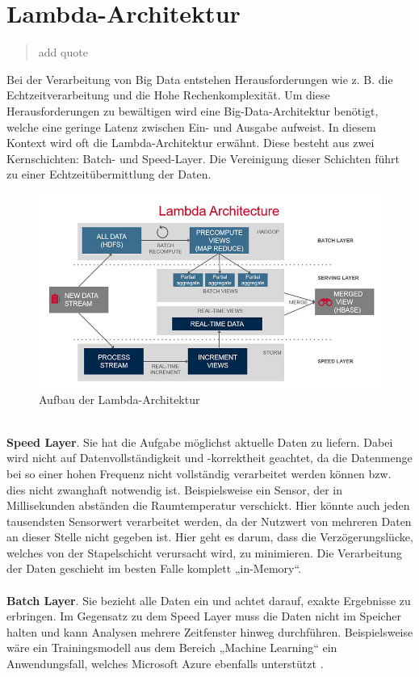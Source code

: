 \section{Lambda-Architektur}

\begin{quote}\glqq add quote \grqq~\cite[S.14]{Roth.2016}\end{quote} 
Bei der Verarbeitung von Big Data entstehen Herausforderungen wie z. B. die Echtzeitverarbeitung und die Hohe Rechenkomplexität. Um diese Herausforderungen zu bewältigen wird eine Big-Data-Architektur benötigt, welche eine geringe Latenz zwischen Ein- und Ausgabe aufweist. In diesem Kontext wird oft die Lambda-Architektur erwähnt. Diese besteht aus zwei Kernschichten: Batch- und Speed-Layer. Die Vereinigung dieser Schichten führt zu einer Echtzeitübermittlung der Daten. 
\begin{figure}[h!]
	\centering
	\includegraphics[width=1.0\linewidth]{images/lambda-architecture}
	\caption{Aufbau der Lambda-Architektur} %
	\label{fig:cnn_structure}
\end{figure}
\\ \textbf{Speed Layer}. Sie hat die Aufgabe möglichst aktuelle Daten zu liefern. Dabei wird nicht auf Datenvollständigkeit und -korrektheit geachtet, da die Datenmenge bei so einer hohen Frequenz nicht vollständig verarbeitet werden können bzw. dies nicht zwanghaft notwendig ist. Beispielsweise ein Sensor, der in Millisekunden abständen die Raumtemperatur verschickt. Hier könnte auch jeden tausendsten Sensorwert verarbeitet werden, da der Nutzwert von mehreren Daten an dieser Stelle nicht gegeben ist. Hier geht es darum, dass die Verzögerungslücke, welches von der Stapelschicht verursacht wird, zu minimieren. Die Verarbeitung der Daten geschieht im besten Falle komplett „in-Memory“.\\ \\ \textbf{Batch Layer}. Sie bezieht alle Daten ein und achtet darauf, exakte Ergebnisse zu erbringen. Im Gegensatz zu dem Speed Layer muss die Daten nicht im Speicher halten und kann Analysen mehrere Zeitfenster hinweg durchführen. Beispielsweise wäre ein Trainingsmodell aus dem Bereich „Machine Learning“ ein Anwendungsfall, welches Microsoft Azure ebenfalls unterstützt \cite{Berle.2017}. 

